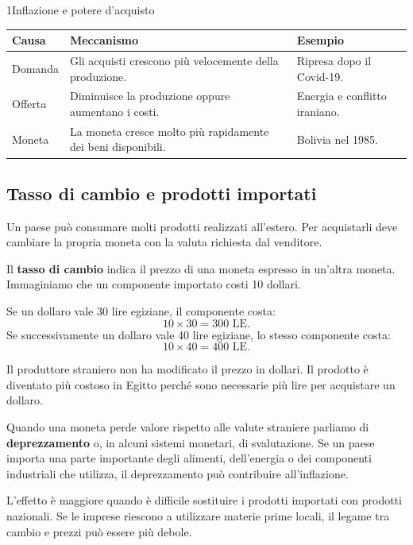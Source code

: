\begin{lettura}{1}{Inflazione e potere d’acquisto}
\begin{center}
\begin{minipage}{\linewidth}\centering\small
\begin{tabularx}{\linewidth}{@{}lXX@{}}
\toprule
\textbf{Causa} & \textbf{Meccanismo} & \textbf{Esempio} \\
\midrule
Domanda & Gli acquisti crescono più velocemente della produzione. & Ripresa dopo il Covid-19. \\
Offerta & Diminuisce la produzione oppure aumentano i costi. & Energia e conflitto iraniano. \\
Moneta & La moneta cresce molto più rapidamente dei beni disponibili. & Bolivia nel 1985. \\
\bottomrule
\end{tabularx}
\end{minipage}
\end{center}

\subsection*{Tasso di cambio e prodotti importati}
Un paese può consumare molti prodotti realizzati all'estero. Per acquistarli deve cambiare la propria moneta con la valuta richiesta dal venditore.

Il \textbf{tasso di cambio} indica il prezzo di una moneta espresso in un'altra moneta. Immaginiamo che un componente importato costi 10 dollari.

Se un dollaro vale 30 lire egiziane, il componente costa:
\[
10 \times 30 = 300 \text{ LE}.
\]
Se successivamente un dollaro vale 40 lire egiziane, lo stesso componente costa:
\[
10 \times 40 = 400 \text{ LE}.
\]

Il produttore straniero non ha modificato il prezzo in dollari. Il prodotto è diventato più costoso in Egitto perché sono necessarie più lire per acquistare un dollaro.

Quando una moneta perde valore rispetto alle valute straniere parliamo di \textbf{deprezzamento} o, in alcuni sistemi monetari, di svalutazione. Se un paese importa una parte importante degli alimenti, dell'energia o dei componenti industriali che utilizza, il deprezzamento può contribuire all'inflazione.

L'effetto è maggiore quando è difficile sostituire i prodotti importati con prodotti nazionali. Se le imprese riescono a utilizzare materie prime locali, il legame tra cambio e prezzi può essere più debole.


\end{lettura}
